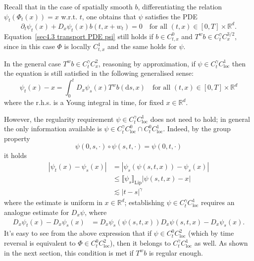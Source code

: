 \documentclass[10pt]{article}
\newcommand{\mathd}{\mathrm{d}}
\newcommand{\tmop}[1]{\ensuremath{\operatorname{#1}}}
\begin{document}
\begin{remark}
  \label{sec4.3 remark transport}Recall that in the case of spatially smooth
  $b$, differentiating the relation $\psi_t (\Phi_t (x)) = x$ w.r.t. $t$, one
  obtains that $\psi$ satisfies the PDE
  \begin{equation}
    \partial_t \psi_t (x) + D_x \psi_t (x) b (t, x + w_t) = 0 \quad \text{for
    all } (t, x) \in [0, T] \times \mathbb{R}^d . \label{sec4.3 transport PDE
    psi}
  \end{equation}
  Equation~{\eqref{sec4.3 transport PDE psi}} still holds if $b \in C^0_{t,
  x}$ and $T^w b \in C^{\gamma}_t C^{3 / 2}_x$, since in this case $\Phi$ is
  locally $C^1_{t, x}$ and the same holds for $\psi$.
  
  In the general case $T^w b \in C^{\gamma}_t C^2_x$, reasoning by
  approximation, if $\psi \in C^{\gamma}_t C^1_{\tmop{loc}}$ then the equation
  is still satisfied in the following generalised sense:
  \begin{equation}
    \psi_t (x) - x = \int_0^t D_x \psi_s (x) T^w b (\mathd s, x) \quad
    \text{for all } (t, x) \in [0, T] \times \mathbb{R}^d \label{sec4.3
    transport PDE psi 2}
  \end{equation}
  where the r.h.s. is a Young integral in time, for fixed $x \in
  \mathbb{R}^d$.
  
  However, the regularity requirement $\psi \in C^{\gamma}_t C^1_{\tmop{loc}}$
  does not need to hold; in general the only information available is $\psi
  \in C^{\gamma}_t C^0_{\tmop{loc}} \cap C^0_t C^1_{\tmop{loc}}$. Indeed, by
  the group property
  \[ \psi (0, s, \cdot) \circ \psi (s, t, \cdot) = \psi (0, t, \cdot) \]
  it holds
%  
  \begin{align*}
    | \psi_t (x) - \psi_s (x) | & = | \psi_s (\psi (s, t, x)) - \psi_s (x) |\\
    & \leqslant \llbracket \psi_s \rrbracket_{\tmop{Lip}}  | \psi (s, t, x) -
    x |\\
    & \lesssim | t - s |^{\gamma}
  \end{align*}
%  
  where the estimate is uniform in $x \in \mathbb{R}^d$; establishing $\psi
  \in C^{\gamma}_t C^1_{\tmop{loc}}$ requires an analogue estimate for $D_x
  \psi$, where
%  
  \begin{align*}
    D_x \psi_t (x) - D_x \psi_s (x) & = D_x \psi_s (\psi (s, t, x)) D_x \psi
    (s, t, x) - D_x \psi_s (x) .
  \end{align*}
%  
  It's easy to see from the above expression that if $\psi \in C^0_t
  C^2_{\tmop{loc}}$ (which by time reversal is equivalent to $\Phi \in C^0_t
  C^2_{\tmop{loc}}$), then it belongs to $C^{\gamma}_t C^1_{\tmop{loc}}$ as
  well. As shown in the next section, this condition is met if $T^w b$ is
  regular enough. 
\end{remark}
\end{document}

